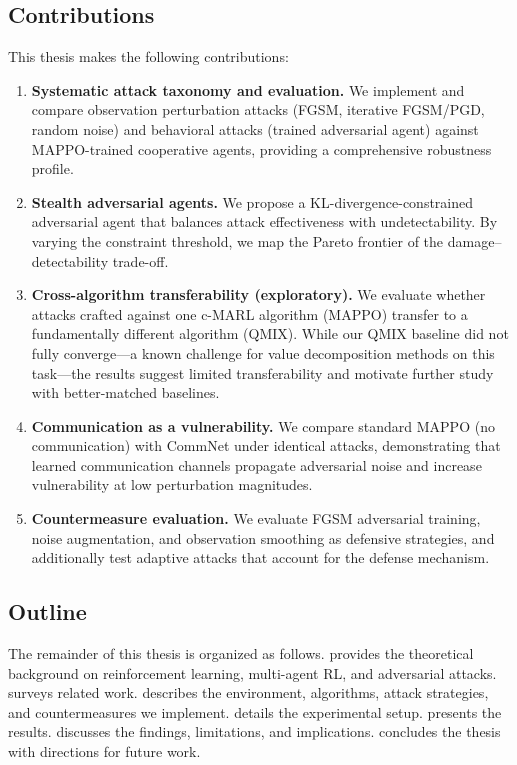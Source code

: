 \documentclass[12pt,a4paper]{article}
\begin{document}
\subsection{Contributions}

This thesis makes the following contributions:

\begin{enumerate}
    \item \textbf{Systematic attack taxonomy and evaluation.} We implement and compare observation perturbation attacks (FGSM, iterative FGSM/PGD, random noise) and behavioral attacks (trained adversarial agent) against MAPPO-trained cooperative agents, providing a comprehensive robustness profile.

    \item \textbf{Stealth adversarial agents.} We propose a KL-divergence-constrained adversarial agent that balances attack effectiveness with undetectability. By varying the constraint threshold, we map the Pareto frontier of the damage--detectability trade-off.

    \item \textbf{Cross-algorithm transferability (exploratory).} We evaluate whether attacks crafted against one c-MARL algorithm (MAPPO) transfer to a fundamentally different algorithm (QMIX). While our QMIX baseline did not fully converge---a known challenge for value decomposition methods on this task---the results suggest limited transferability and motivate further study with better-matched baselines.

    \item \textbf{Communication as a vulnerability.} We compare standard MAPPO (no communication) with CommNet under identical attacks, demonstrating that learned communication channels propagate adversarial noise and increase vulnerability at low perturbation magnitudes.

    \item \textbf{Countermeasure evaluation.} We evaluate FGSM adversarial training, noise augmentation, and observation smoothing as defensive strategies, and additionally test adaptive attacks that account for the defense mechanism.
\end{enumerate}

\subsection{Outline}

The remainder of this thesis is organized as follows.  provides the theoretical background on reinforcement learning, multi-agent RL, and adversarial attacks.  surveys related work.  describes the environment, algorithms, attack strategies, and countermeasures we implement.  details the experimental setup.  presents the results.  discusses the findings, limitations, and implications.  concludes the thesis with directions for future work.
\end{document}
